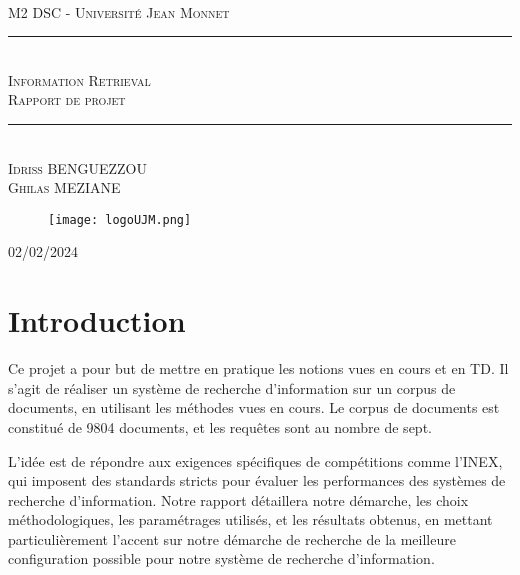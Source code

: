 \documentclass[a4paper, 12pt]{article}
\newcommand{\HRule}{\rule{\linewidth}{0.5mm}}
\begin{document}
\begin{titlepage}
  \begin{sffamily}
  \begin{center}

   
    \textsc{\LARGE }\\[2cm]

    \textsc{\Large M2 DSC - Université Jean Monnet}\\[1.5cm]

    \HRule \\[0.4cm]
    { \huge  \textsc{Information Retrieval} \\
    \textsc{\Large Rapport de projet} \\[0.4cm] }
	
    \HRule \\[2cm]
    \textsc {Idriss BENGUEZZOU \\Ghilas MEZIANE}
 \begin{figure}
     \centering
    \texttt{[image: logoUJM.png]}
     \label{fig:ujm_logo}
 \end{figure}

    \vfill

    {\large {} 02/02/2024}

  \end{center}
  \end{sffamily}
\end{titlepage}

\newpage

\tableofcontents

\newpage

\section{Introduction}
Ce projet a pour but de mettre en pratique les notions vues en cours et en TD. 
Il s'agit de réaliser un système de recherche d'information sur un corpus de documents, en utilisant les méthodes vues en cours. 
Le corpus de documents est constitué de 9804 documents, et les requêtes sont au nombre de sept.

L'idée est de répondre aux exigences spécifiques de compétitions comme l'INEX, qui imposent des standards stricts pour évaluer les performances des systèmes de recherche d'information.
Notre rapport détaillera notre démarche, les choix méthodologiques, les paramétrages utilisés, et les résultats obtenus, en mettant particulièrement 
l'accent sur notre démarche de recherche de la meilleure configuration possible pour notre système de recherche d'information.
\end{document}
